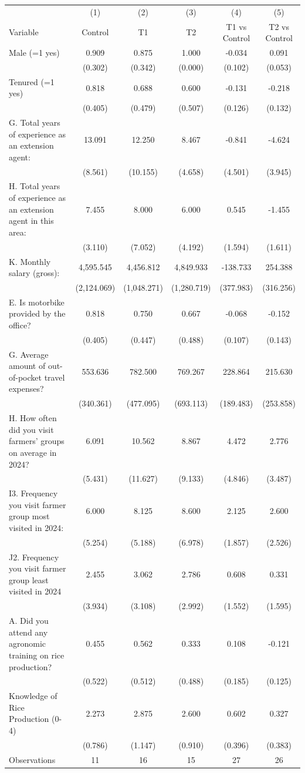 \begin{tabular}{l*{5}c}
\hline\hline
 & (1) & (2) & (3) & (4) & (5) \\
Variable & Control & T1 & T2 & T1 vs Control & T2 vs Control \\
\hline
Male (=1 yes)&0.909&0.875&1.000&-0.034&0.091\\
&(0.302)&(0.342)&(0.000)&(0.102)&(0.053)\\
Tenured (=1 yes)&0.818&0.688&0.600&-0.131&-0.218\\
&(0.405)&(0.479)&(0.507)&(0.126)&(0.132)\\
G. Total years of experience as an extension agent:&13.091&12.250&8.467&-0.841&-4.624\\
&(8.561)&(10.155)&(4.658)&(4.501)&(3.945)\\
H. Total years of experience as an extension agent in this area:&7.455&8.000&6.000&0.545&-1.455\\
&(3.110)&(7.052)&(4.192)&(1.594)&(1.611)\\
K. Monthly salary (gross):&4,595.545&4,456.812&4,849.933&-138.733&254.388\\
&(2,124.069)&(1,048.271)&(1,280.719)&(377.983)&(316.256)\\
E. Is motorbike provided by the office?&0.818&0.750&0.667&-0.068&-0.152\\
&(0.405)&(0.447)&(0.488)&(0.107)&(0.143)\\
G. Average amount of out-of-pocket travel expenses?&553.636&782.500&769.267&228.864&215.630\\
&(340.361)&(477.095)&(693.113)&(189.483)&(253.858)\\
H. How often did you visit farmers' groups on average in 2024?&6.091&10.562&8.867&4.472&2.776\\
&(5.431)&(11.627)&(9.133)&(4.846)&(3.487)\\
I3. Frequency you visit farmer group most visited in 2024:&6.000&8.125&8.600&2.125&2.600\\
&(5.254)&(5.188)&(6.978)&(1.857)&(2.526)\\
J2. Frequency you visit farmer group least visited in 2024&2.455&3.062&2.786&0.608&0.331\\
&(3.934)&(3.108)&(2.992)&(1.552)&(1.595)\\
A. Did you attend any agronomic training on rice production?&0.455&0.562&0.333&0.108&-0.121\\
&(0.522)&(0.512)&(0.488)&(0.185)&(0.125)\\
Knowledge of Rice Production (0-4)&2.273&2.875&2.600&0.602&0.327\\
&(0.786)&(1.147)&(0.910)&(0.396)&(0.383)\\
\hline
Observations & 11 & 16 & 15 & 27 & 26 \\
\hline\hline
\end{tabular}
